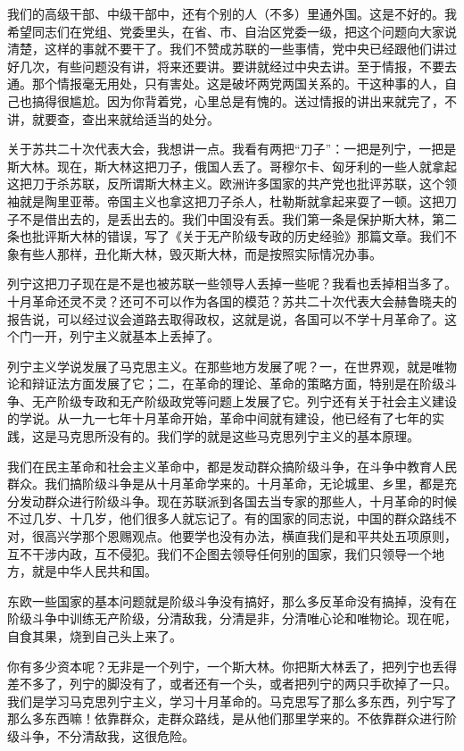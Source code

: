 我们的高级干部、中级干部中，还有个别的人（不多）里通外国。这是不好的。我希望同志们在党组、党委里头，在省、市、自治区党委一级，把这个问题向大家说清楚，这样的事就不要干了。我们不赞成苏联的一些事情，党中央已经跟他们讲过好几次，有些问题没有讲，将来还要讲。要讲就经过中央去讲。至于情报，不要去通。那个情报毫无用处，只有害处。这是破坏两党两国关系的。干这种事的人，自己也搞得很尴尬。因为你背着党，心里总是有愧的。送过情报的讲出来就完了，不讲，就要查，查出来就给适当的处分。

关于苏共二十次代表大会，我想讲一点。我看有两把“刀子”：一把是列宁，一把是斯大林。现在，斯大林这把刀子，俄国人丢了。哥穆尔卡、匈牙利的一些人就拿起这把刀于杀苏联，反所谓斯大林主义。欧洲许多国家的共产党也批评苏联，这个领袖就是陶里亚蒂。帝国主义也拿这把刀子杀人，杜勒斯就拿起来耍了一顿。这把刀子不是借出去的，是丢出去的。我们中国没有丢。我们第一条是保护斯大林，第二条也批评斯大林的错误，写了《关于无产阶级专政的历史经验》那篇文章。我们不象有些人那样，丑化斯大林，毁灭斯大林，而是按照实际情况办事。

列宁这把刀子现在是不是也被苏联一些领导人丢掉一些呢？我看也丢掉相当多了。十月革命还灵不灵？还可不可以作为各国的模范？苏共二十次代表大会赫鲁晓夫的报告说，可以经过议会道路去取得政权，这就是说，各国可以不学十月革命了。这个门一开，列宁主义就基本上丢掉了。

列宁主义学说发展了马克思主义。在那些地方发展了呢？一，在世界观，就是唯物论和辩证法方面发展了它；二，在革命的理论、革命的策略方面，特别是在阶级斗争、无产阶级专政和无产阶级政党等问题上发展了它。列宁还有关于社会主义建设的学说。从一九一七年十月革命开始，革命中间就有建设，他已经有了七年的实践，这是马克思所没有的。我们学的就是这些马克思列宁主义的基本原理。

我们在民主革命和社会主义革命中，都是发动群众搞阶级斗争，在斗争中教育人民群众。我们搞阶级斗争是从十月革命学来的。十月革命，无论城里、乡里，都是充分发动群众进行阶级斗争。现在苏联派到各国去当专家的那些人，十月革命的时候不过几岁、十几岁，他们很多人就忘记了。有的国家的同志说，中国的群众路线不对，很高兴学那个恩赐观点。他要学也没有办法，横直我们是和平共处五项原则，互不干涉内政，互不侵犯。我们不企图去领导任何别的国家，我们只领导一个地方，就是中华人民共和国。

东欧一些国家的基本问题就是阶级斗争没有搞好，那么多反革命没有搞掉，没有在阶级斗争中训练无产阶级，分清敌我，分清是非，分清唯心论和唯物论。现在呢，自食其果，烧到自己头上来了。

你有多少资本呢？无非是一个列宁，一个斯大林。你把斯大林丢了，把列宁也丢得差不多了，列宁的脚没有了，或者还有一个头，或者把列宁的两只手砍掉了一只。我们是学习马克思列宁主义，学习十月革命的。马克思写了那么多东西，列宁写了那么多东西嘛！依靠群众，走群众路线，是从他们那里学来的。不依靠群众进行阶级斗争，不分清敌我，这很危险。

